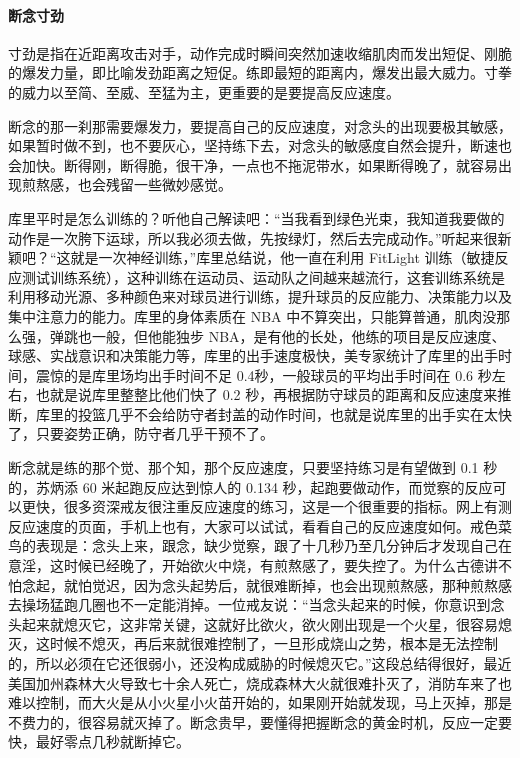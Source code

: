 \paragraph{断念寸劲}

寸劲是指在近距离攻击对手，动作完成时瞬间突然加速收缩肌肉而发出短促、刚脆的爆发力量，即比喻发劲距离之短促。练即最短的距离内，爆发出最大威力。寸拳的威力以至简、至威、至猛为主，更重要的是要提高反应速度。

断念的那一刹那需要爆发力，要提高自己的反应速度，对念头的出现要极其敏感，如果暂时做不到，也不要灰心，坚持练下去，对念头的敏感度自然会提升，断速也会加快。断得刚，断得脆，很干净，一点也不拖泥带水，如果断得晚了，就容易出现煎熬感，也会残留一些微妙感觉。

库里平时是怎么训练的？听他自己解读吧：“当我看到绿色光束，我知道我要做的动作是一次胯下运球，所以我必须去做，先按绿灯，然后去完成动作。”听起来很新颖吧？“这就是一次神经训练，”库里总结说，他一直在利用 FitLight 训练（敏捷反应测试训练系统），这种训练在运动员、运动队之间越来越流行，这套训练系统是利用移动光源、多种颜色来对球员进行训练，提升球员的反应能力、决策能力以及集中注意力的能力。库里的身体素质在 NBA 中不算突出，只能算普通，肌肉没那么强，弹跳也一般，但他能独步 NBA，是有他的长处，他练的项目是反应速度、球感、实战意识和决策能力等，库里的出手速度极快，美专家统计了库里的出手时间，震惊的是库里场均出手时间不足 0.4秒，一般球员的平均出手时间在 0.6 秒左右，也就是说库里整整比他们快了 0.2 秒，再根据防守球员的距离和反应速度来推断，库里的投篮几乎不会给防守者封盖的动作时间，也就是说库里的出手实在太快了，只要姿势正确，防守者几乎干预不了。

断念就是练的那个觉、那个知，那个反应速度，只要坚持练习是有望做到 0.1 秒的，苏炳添 60 米起跑反应达到惊人的 0.134 秒，起跑要做动作，而觉察的反应可以更快，很多资深戒友很注重反应速度的练习，这是一个很重要的指标。网上有测反应速度的页面，手机上也有，大家可以试试，看看自己的反应速度如何。戒色菜鸟的表现是：念头上来，跟念，缺少觉察，跟了十几秒乃至几分钟后才发现自己在意淫，这时候已经晚了，开始欲火中烧，有煎熬感了，要失控了。为什么古德讲不怕念起，就怕觉迟，因为念头起势后，就很难断掉，也会出现煎熬感，那种煎熬感去操场猛跑几圈也不一定能消掉。一位戒友说：“当念头起来的时候，你意识到念头起来就熄灭它，这非常关键，这就好比欲火，欲火刚出现是一个火星，很容易熄灭，这时候不熄灭，再后来就很难控制了，一旦形成烧山之势，根本是无法控制的，所以必须在它还很弱小，还没构成威胁的时候熄灭它。”这段总结得很好，最近美国加州森林大火导致七十余人死亡，烧成森林大火就很难扑灭了，消防车来了也难以控制，而大火是从小火星小火苗开始的，如果刚开始就发现，马上灭掉，那是不费力的，很容易就灭掉了。断念贵早，要懂得把握断念的黄金时机，反应一定要快，最好零点几秒就断掉它。

